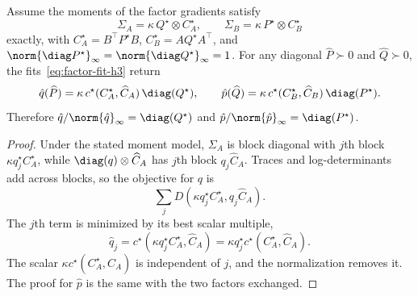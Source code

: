 \begin{lemma}\label{lem:consistency-h3}
Assume the moments of the factor gradients satisfy
\[
  \Sigma_A=\kappa\,Q^\star\otimes C^\star_A,
  \qquad
  \Sigma_B=\kappa\,P^\star\otimes C^\star_B
\]
exactly, with
$C^\star_A=B^\top P^\star B$,
$C^\star_B=AQ^\star A^\top$, and
$\norm{\diag P^\star}_\infty=\norm{\diag Q^\star}_\infty=1$.
For any diagonal $\widehat P\succ0$ and $\widehat Q\succ0$, the
fits~\eqref{eq:factor-fit-h3} return
\[
  \hat{q}(\widehat P)
  =
  \kappa\,c^\star(C^\star_A,\widehat C_A)\,\diag(Q^\star),
  \qquad
  \hat{p}(\widehat Q)
  =
  \kappa\,c^\star(C^\star_B,\widehat C_B)\,\diag(P^\star).
\]
Therefore
$\hat{q}/\norm{\hat{q}}_\infty=\diag(Q^\star)$ and
$\hat{p}/\norm{\hat{p}}_\infty=\diag(P^\star)$.
\end{lemma}
\begin{proof}
Under the stated moment model, $\Sigma_A$ is block diagonal
with $j$th block $\kappa q^\star_j C^\star_A$, while
$\diag(q)\otimes\widehat C_A$ has $j$th block $q_j\widehat C_A$.
Traces and log-determinants add across blocks, so the objective for
$q$ is
\[
  \sum_j D(\kappa q^\star_j C^\star_A, q_j\widehat C_A).
\]
The $j$th term is minimized by its best scalar multiple,
\[
  \hat q_j
  =
  c^\star(\kappa q^\star_j C^\star_A,\widehat C_A)
  =
  \kappa q^\star_j c^\star(C^\star_A,\widehat C_A).
\]
The scalar $\kappa c^\star(C^\star_A,\widehat C_A)$ is independent of
$j$, and the normalization removes it. The proof for $\hat p$ is the
same with the two factors exchanged.
\end{proof}

